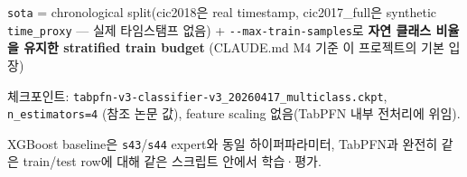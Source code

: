 \par\noindent \textbullet\enspace \texttt{sota} =\allowbreak{} chronological split(cic2018은 real timestamp, cic2017\_\allowbreak{}full은 synthetic \texttt{time\_\allowbreak{}\allowbreak{}pro\allowbreak{}xy} — 실제 타임스탬프 없음) +\allowbreak{} \texttt{-\allowbreak{}-\allowbreak{}max-\allowbreak{}tr\allowbreak{}ain-\allowbreak{}samp\allowbreak{}les}로 \textbf{자연 클래스 비율을 유지한 stratified train budget} (CLAUDE.md M4 기준 이 프로젝트의 기본 입장)



\par\noindent \textbullet\enspace 체크포인트: \texttt{tabpfn-\allowbreak{}v\allowbreak{}3-\allowbreak{}classi\allowbreak{}fier-\allowbreak{}v3\_\allowbreak{}\allowbreak{}20260417\allowbreak{}\_\allowbreak{}\allowbreak{}multicl\allowbreak{}ass.\allowbreak{}ckpt\allowbreak{}}, \texttt{n\_\allowbreak{}\allowbreak{}estima\allowbreak{}tors=\allowbreak{}\allowbreak{}4} (참조 논문 값), feature scaling 없음(TabPFN 내부 전처리에 위임).


\par\noindent \textbullet\enspace XGBoost baseline은 \texttt{s43}/\allowbreak{}\texttt{s44} expert와 동일 하이퍼파라미터, TabPFN과 완전히 같은 train/\allowbreak{}test row에 대해 같은 스크립트 안에서 학습·평가.


